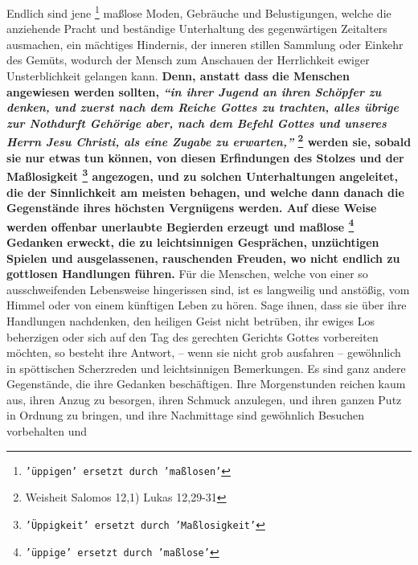 Endlich sind jene \footnote{\texttt{'üppigen' ersetzt durch 'maßlosen'}}
maßlose Moden, Gebräuche und Belustigungen, welche die
anziehende Pracht und beständige Unterhaltung des gegenwärtigen Zeitalters
ausmachen, ein mächtiges Hindernis, der inneren stillen 
Sammlung oder Einkehr des
Gemüts, wodurch der Mensch zum Anschauen der Herrlichkeit ewiger
Unsterblichkeit gelangen kann.
\label{ref:17_01_erziehung}
\textbf{Denn, anstatt dass die Menschen angewiesen werden
sollten,
\textit{"`in ihrer Jugend an ihren Schöpfer zu denken, und zuerst nach dem
Reiche Gottes zu trachten, alles übrige zur Nothdurft
Gehörige aber, nach dem
Befehl Gottes und unseres Herrn Jesu Christi, als eine Zugabe zu
erwarten,"'}
\footnote{Weisheit Salomos 12,1) Lukas  12,29-31}
werden sie, sobald sie nur
etwas tun können, von diesen Erfindungen des Stolzes und der Maßlosigkeit
\footnote{\texttt{'Üppigkeit' ersetzt durch 'Maßlosigkeit'}}
angezogen, und zu solchen Unterhaltungen angeleitet, die der Sinnlichkeit am
meisten behagen, und welche dann danach die Gegenstände ihres höchsten
Vergnügens werden. Auf diese Weise werden offenbar unerlaubte Begierden erzeugt
und maßlose
\footnote{\texttt{'üppige' ersetzt durch 'maßlose'}} Gedanken erweckt, die zu
leichtsinnigen Gesprächen, unzüchtigen
Spielen und ausgelassenen, rauschenden Freuden, wo nicht endlich zu gottlosen
Handlungen führen.} Für die Menschen, welche von einer so ausschweifenden
Lebensweise hingerissen sind, ist es langweilig und anstößig, vom Himmel oder
von einem künftigen Leben zu hören. Sage ihnen, dass sie über ihre Handlungen
nachdenken, den heiligen Geist nicht betrüben, ihr ewiges
Los beherzigen oder
sich auf den Tag des gerechten Gerichts Gottes
vorbereiten möchten, so besteht
ihre Antwort, -- wenn sie nicht grob ausfahren -- gewöhnlich in spöttischen
Scherzreden und leichtsinnigen Bemerkungen. Es sind ganz andere Gegenstände, die
ihre Gedanken beschäftigen. Ihre Morgenstunden reichen kaum aus, ihren Anzug zu
besorgen, ihren Schmuck anzulegen, und ihren ganzen Putz in Ordnung zu bringen,
und ihre Nachmittage sind gewöhnlich Besuchen vorbehalten und
\label{ref:17_01_schauspiel}
